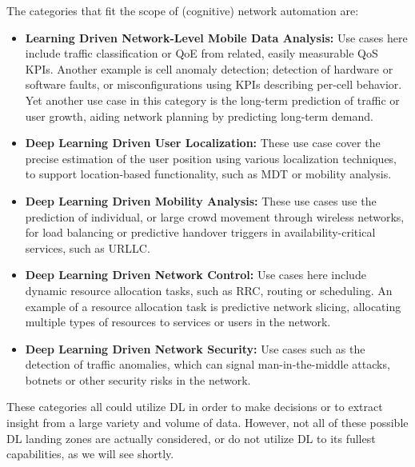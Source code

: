 			The categories that fit the scope of (cognitive) network automation are:			
			\begin{itemize}
				\item \textbf{Learning Driven Network-Level Mobile Data Analysis:}
				Use cases here include traffic classification or \ac{QoE} from related, easily measurable \ac{QoS} \acp{KPI}.
				Another example is cell anomaly detection; detection of hardware or software faults, or misconfigurations using \acp{KPI} describing per-cell behavior.
				Yet another use case in this category is the long-term prediction of traffic or user growth, aiding network planning by predicting long-term demand.
				
				\item \textbf{Deep Learning Driven User Localization:}
				These use case cover the precise estimation of the user position using various localization techniques, to support location-based functionality, such as \ac{MDT} or mobility analysis.
				
				\item \textbf{Deep Learning Driven Mobility Analysis:}
				These use cases use the prediction of individual, or large crowd movement through wireless networks, for load balancing or predictive handover triggers in availability-critical services, such as \ac{URLLC}.
				
				\item \textbf{Deep Learning Driven Network Control:}
				Use cases here include dynamic resource allocation tasks, such as \ac{RRC}, routing or scheduling.
				An example of a resource allocation task is predictive network slicing, allocating multiple types of resources to services or users in the network.
				
				\item \textbf{Deep Learning Driven Network Security:}
				Use cases such as the detection of traffic anomalies, which can signal man-in-the-middle attacks, botnets or other security risks in the network.
			\end{itemize}		
			\noindent These categories all could utilize \ac{DL} in order to make decisions or to extract insight from a large variety and volume of data.
			However, not all of these possible \ac{DL} landing zones are actually considered, or do not utilize \ac{DL} to its fullest capabilities, as we will see shortly.
			
			
